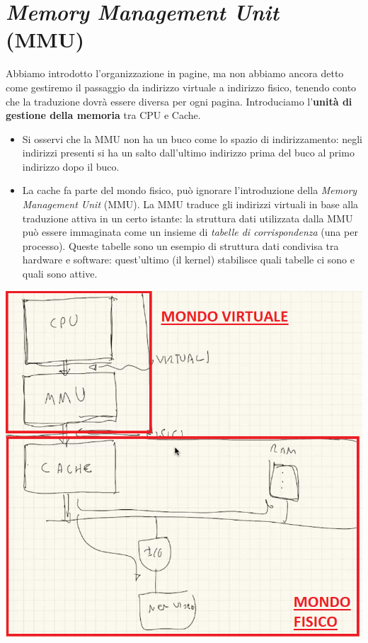 \section{\emph{Memory Management Unit} (MMU)}
Abbiamo introdotto l'organizzazione in pagine, ma non abbiamo ancora detto come gestiremo il passaggio da indirizzo virtuale a indirizzo fisico, tenendo conto che la traduzione dovrà essere diversa per ogni pagina. Introduciamo l'\textbf{unità di gestione della memoria} tra CPU e Cache.
\begin{itemize}
	\item Si osservi che la MMU non ha un buco come lo spazio di indirizzamento: negli indirizzi presenti si ha un salto dall'ultimo indirizzo prima del buco al primo indirizzo dopo il buco.
	\item La cache fa parte del mondo fisico, può ignorare l'introduzione della \emph{Memory Management Unit} (MMU). La MMU traduce gli indirizzi virtuali in base alla traduzione attiva in un certo istante: la struttura dati utilizzata dalla MMU può essere immaginata come un insieme di \textit{tabelle di corrispondenza} (una per processo). Queste tabelle sono un esempio di struttura dati condivisa tra hardware e software: quest'ultimo (il kernel) stabilisce quali tabelle ci sono e quali sono attive.
\end{itemize}
\begin{center}
	\includegraphics[scale=.5]{img/213.PNG}
\end{center}

